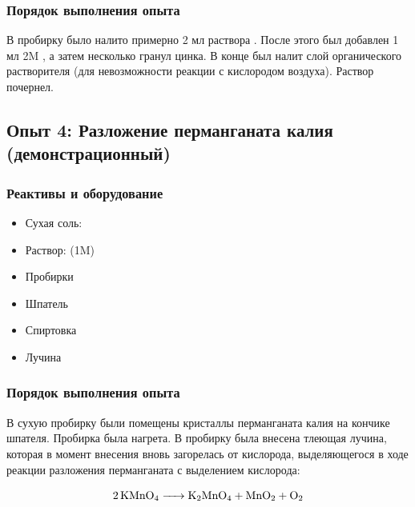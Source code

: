 \documentclass[a4paper, 12pt]{article}
\begin{document}
\subsubsection{Порядок выполнения опыта}

В пробирку было налито примерно 2 мл раствора . После этого был добавлен 1 мл 2M , а затем несколько гранул цинка. В конце был налит слой органического растворителя (для невозможности реакции с кислородом воздуха). Раствор почернел.



\subsection{Опыт 4: Разложение перманганата калия (демонстрационный)}

\subsubsection{Реактивы и оборудование}

\begin{itemize}
	\item Сухая соль: 
	\item Раствор:  (1M)
	
	\item Пробирки
	\item Шпатель
	\item Спиртовка
	\item Лучина
\end{itemize}

\subsubsection{Порядок выполнения опыта}

В сухую пробирку были помещены кристаллы перманганата калия на кончике шпателя. Пробирка была нагрета. В пробирку была внесена тлеющая лучина, которая в момент внесения вновь загорелась от кислорода, выделяющегося в ходе реакции разложения перманганата с выделением кислорода:

\begin{equation}
	\ce{2KMnO4 -> K2MnO4 + MnO2 + O2}
\end{equation}
\end{document}
